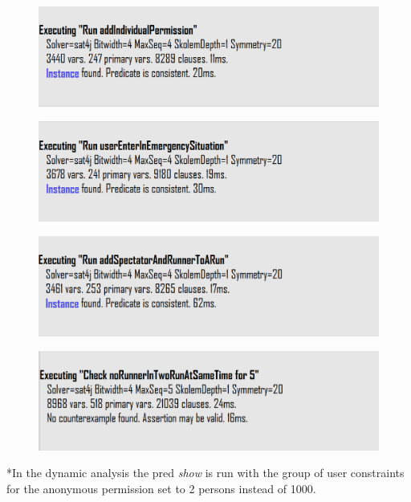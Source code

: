 \documentclass[a4paper]{article}
\begin{document}
\begin{figure}[H]
    \centering
    \includegraphics[width=\textwidth]{alloyResult2}
\end{figure}

\begin{figure}[H]
    \centering
    \includegraphics[width=\textwidth]{alloyResult3}
\end{figure}

\begin{figure}[H]
    \centering
    \includegraphics[width=\textwidth]{alloyResult4}
\end{figure}

\begin{figure}[H]
    \centering
    \includegraphics[width=\textwidth]{alloyResult5}
\end{figure}

*In the dynamic analysis the pred \textit{show} is run with the group of user constraints for the anonymous permission set to 2 persons instead of 1000.
\end{document}
